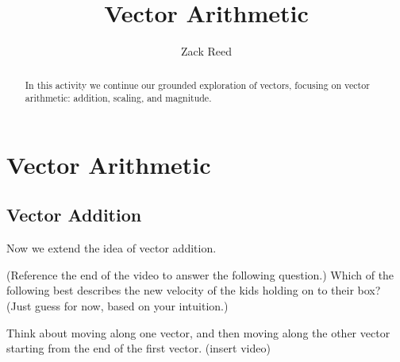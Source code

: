 \documentclass{ximera}
\title{Vector Arithmetic}
\author{Zack Reed}
\begin{document}
\begin{abstract}
In this activity we continue our grounded exploration of vectors, focusing on vector arithmetic: addition, scaling, and magnitude.
\end{abstract}
\maketitle

\section*{Vector Arithmetic}

\subsection*{Vector Addition}

Now we extend the idea of vector addition.

\begin{center}
\end{center}

\begin{problem}
(Reference the end of the video to answer the following question.)
Which of the following best describes the new velocity of the kids holding on to their box? (Just guess for now, based on your intuition.)
\begin{multipleChoice}
\end{multipleChoice}
\begin{feedback}
Think about moving along one vector, and then moving along the other vector starting from the end of the first vector.
(insert video)
\end{feedback}
\end{problem}
\end{document}
